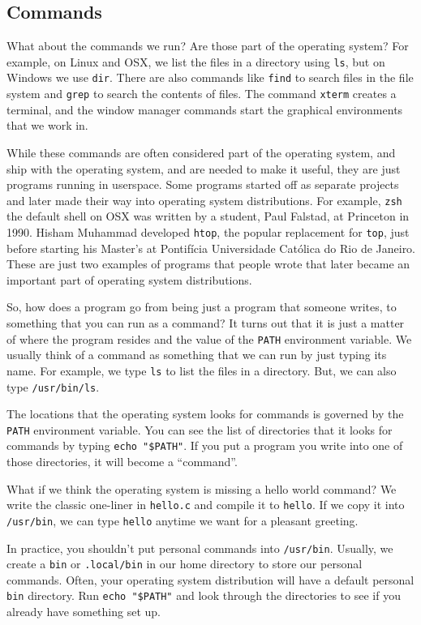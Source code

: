 \documentclass{article}
\begin{document}
\subsection{Commands}

What about the commands we run? Are those part of the operating system?
For example, on Linux and OSX, we list the files in a directory using \texttt{ls}, but on Windows we use \texttt{dir}.
There are also commands like \texttt{find} to search files in the file system and \texttt{grep} to search the contents of files.
The command \texttt{xterm} creates a terminal, and the window manager commands start the graphical environments that we work in.

While these commands are often considered part of the operating system, and ship with the operating system, and are needed to make it useful, they are just programs running in userspace.
Some programs started off as separate projects and later made their way into operating system distributions.
For example, \texttt{zsh} the default shell on OSX was written by a student, Paul Falstad, at Princeton in 1990.
Hisham Muhammad developed \texttt{htop}, the popular replacement for \texttt{top}, just before starting his Master's at Pontifícia Universidade Católica do Rio de Janeiro.
These are just two examples of programs that people wrote that later became an important part of operating system distributions.

So, how does a program go from being just a program that someone writes, to something that you can run as a command?
It turns out that it is just a matter of where the program resides and the value of the \texttt{PATH} environment variable.
We usually think of a command as something that we can run by just typing its name.
For example, we type \texttt{ls} to list the files in a directory.
But, we can also type \texttt{/usr/bin/ls}.

The locations that the operating system looks for commands is governed by the \texttt{PATH} environment variable.
You can see the list of directories that it looks for commands by typing \texttt{echo "\$PATH"}.
If you put a program you write into one of those directories, it will become a ``command''.

What if we think the operating system is missing a hello world command?
We write the classic one-liner in \texttt{hello.c} and compile it to \texttt{hello}.
If we copy it into \texttt{/usr/bin}, we can type \texttt{hello} anytime we want for a pleasant greeting.

In practice, you shouldn't put personal commands into \texttt{/usr/bin}.
Usually, we create a \texttt{bin} or \texttt{.local/bin} in our home directory to store our personal commands.
Often, your operating system distribution will have a default personal \texttt{bin} directory.
Run \texttt{echo "\$PATH"} and look through the directories to see if you already have something set up.
\end{document}
